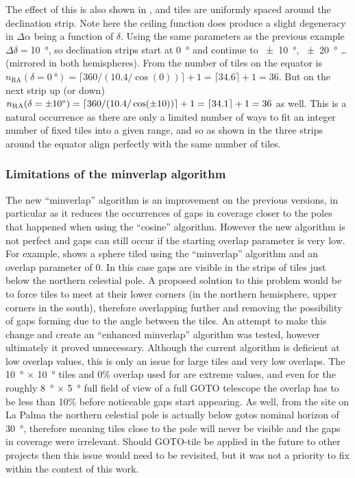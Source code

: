 \begin{colsection}
\begin{colsection}
The effect of this is also shown in , and tiles are uniformly spaced around the declination strip. Note here the ceiling function does produce a slight degeneracy in $\Delta\alpha$ being a function of $\delta$. Using the same parameters as the previous example $\Delta\delta=$\SI{10}{\degree}, so declination strips start at \SI{0}{\degree} and continue to \SI{\pm10}{\degree}, \SI{\pm20}{\degree} \ldots (mirrored in both hemispheres). From  the number of tiles on the equator is $n_\text{RA}(\delta=\SI{0}{\degree}) = \lceil 360/(10.4/\cos(0)) \rceil + 1 = \lceil 34.6 \rceil + 1 = 36$. But on the next strip up (or down) $n_\text{RA}(\delta=\SI{\pm10}{\degree}) = \lceil 360/(10.4/\cos(\pm10)) \rceil + 1 = \lceil 34.1 \rceil + 1 = 36$ as well. This is a natural occurrence as there are only a limited number of ways to fit an integer number of fixed tiles into a given range, and so as shown in  the three strips around the equator align perfectly with the same number of tiles.

\subsubsection{Limitations of the minverlap algorithm}

The new ``minverlap'' algorithm is an improvement on the previous versions, in particular as it reduces the occurrences of gaps in coverage closer to the poles that happened when using the ``cosine'' algorithm. However the new algorithm is not perfect and gaps can still occur if the starting overlap parameter is very low. For example,  shows a sphere tiled using the ``minverlap'' algorithm and an overlap parameter of 0. In this case gaps are visible in the strips of tiles just below the northern celestial pole. A proposed solution to this problem would be to force tiles to meet at their lower corners (in the northern hemisphere, upper corners in the south), therefore overlapping further and removing the possibility of gaps forming due to the angle between the tiles. An attempt to make this change and create an ``enhanced minverlap'' algorithm was tested, however ultimately it proved unnecessary. Although the current algorithm is deficient at low overlap values, this is only an issue for large tiles and very low overlaps. The \SI{10}{\degree} $\times$ \SI{10}{\degree} tiles and 0\% overlap used for  are extreme values, and even for the roughly \SI{8}{\degree} $\times$ \SI{5}{\degree} full field of view of a full GOTO telescope the overlap has to be less than 10\% before noticeable gaps start appearing. As well, from the site on La Palma the northern celestial pole is actually below \glspl{goto} nominal horizon of \SI{30}{\degree}, therefore meaning tiles close to the pole will never be visible and the gaps in coverage were irrelevant. Should GOTO-tile be applied in the future to other projects then this issue would need to be revisited, but it was not a priority to fix within the context of this work.


\end{colsection}
\end{colsection}
